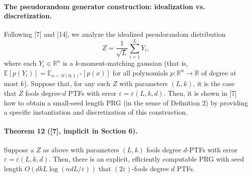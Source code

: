 \paragraph{The pseudorandom generator construction: idealization vs. discretization.} Following [7] and [14], we analyze the idealized pseudorandom distribution
\[Z=\frac1{\sqrt L}\sum_{i=1}^LY_i,\]
where each $Y_i\in\mathbb R^n$ is a $k$-moment-matching gaussian (that is, $\mathbb E[p(Y_i)]=\mathbb E_{x\sim N(0,1)^n}[p(x)]$ for all polynomials $p:\mathbb R^n\to\mathbb R$ of degree at most $k$).
Suppose that, for any such $Z$ with parameters $(L,k)$, it is the case that $Z$ fools degree-$d$ PTFs with error $\varepsilon=\varepsilon(L,k,d)$. Then, it is shown in [7] how to obtain a small-seed length PRG (in the sense of Definition 2) by providing a specific instantiation and discretization of this construction.
\paragraph{Theorem 12 ([7], implicit in Section 6).} Suppose a $Z$ as above with parameters $(L,k)$ fools degree $d$-PTFs with error $\varepsilon=\varepsilon(L,k,d)$. Then, there is an explicit, efficiently computable PRG with seed length $O(dkL\log(ndL/\varepsilon))$ that $(2\varepsilon)$-fools degree $d$ PTFs.
